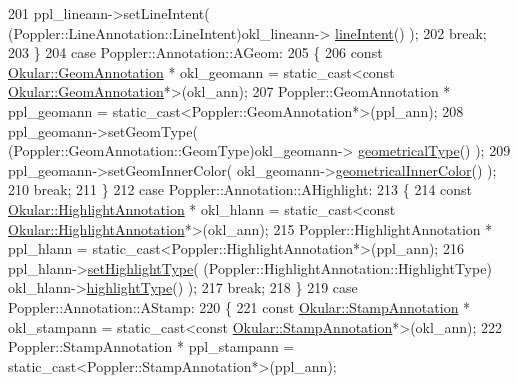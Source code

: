\begin{DoxyCode}
201             ppl\_lineann->setLineIntent( (Poppler::LineAnnotation::LineIntent)okl\_lineann->
      \hyperlink{classOkular_1_1LineAnnotation_a32833faa92a3f7ea334b6a83ff23a36a}{lineIntent}() );
202             \textcolor{keywordflow}{break};
203         \}
204         \textcolor{keywordflow}{case} Poppler::Annotation::AGeom:
205         \{
206             \textcolor{keyword}{const} \hyperlink{classOkular_1_1GeomAnnotation}{Okular::GeomAnnotation} * okl\_geomann = \textcolor{keyword}{static\_cast<}\textcolor{keyword}{const }
      \hyperlink{classOkular_1_1GeomAnnotation}{Okular::GeomAnnotation}*\textcolor{keyword}{>}(okl\_ann);
207             Poppler::GeomAnnotation * ppl\_geomann = \textcolor{keyword}{static\_cast<}Poppler::GeomAnnotation*\textcolor{keyword}{>}(ppl\_ann);
208             ppl\_geomann->setGeomType( (Poppler::GeomAnnotation::GeomType)okl\_geomann->
      \hyperlink{classOkular_1_1GeomAnnotation_adeae1cc4b72aed7e9705b51f91f8555f}{geometricalType}() );
209             ppl\_geomann->setGeomInnerColor( okl\_geomann->\hyperlink{classOkular_1_1GeomAnnotation_a5c84e1cbdf0d2bb6b75b6d6b049af63b}{geometricalInnerColor}() );
210             \textcolor{keywordflow}{break};
211         \}
212         \textcolor{keywordflow}{case} Poppler::Annotation::AHighlight:
213         \{
214             \textcolor{keyword}{const} \hyperlink{classOkular_1_1HighlightAnnotation}{Okular::HighlightAnnotation} * okl\_hlann = \textcolor{keyword}{static\_cast<}\textcolor{keyword}{const }
      \hyperlink{classOkular_1_1HighlightAnnotation}{Okular::HighlightAnnotation}*\textcolor{keyword}{>}(okl\_ann);
215             Poppler::HighlightAnnotation * ppl\_hlann = \textcolor{keyword}{static\_cast<}Poppler::HighlightAnnotation*\textcolor{keyword}{>}(ppl\_ann);
216             ppl\_hlann->\hyperlink{classOkular_1_1HighlightAnnotation_af02dd3d33472c9e903fea2e4a58363c4}{setHighlightType}( (Poppler::HighlightAnnotation::HighlightType)
      okl\_hlann->\hyperlink{classOkular_1_1HighlightAnnotation_a3e95972aebea730877a033f8b2908b90}{highlightType}() );
217             \textcolor{keywordflow}{break};
218         \}
219         \textcolor{keywordflow}{case} Poppler::Annotation::AStamp:
220         \{
221             \textcolor{keyword}{const} \hyperlink{classOkular_1_1StampAnnotation}{Okular::StampAnnotation} * okl\_stampann = \textcolor{keyword}{static\_cast<}\textcolor{keyword}{const }
      \hyperlink{classOkular_1_1StampAnnotation}{Okular::StampAnnotation}*\textcolor{keyword}{>}(okl\_ann);
222             Poppler::StampAnnotation * ppl\_stampann = \textcolor{keyword}{static\_cast<}Poppler::StampAnnotation*\textcolor{keyword}{>}(ppl\_ann);

\end{DoxyCode}

